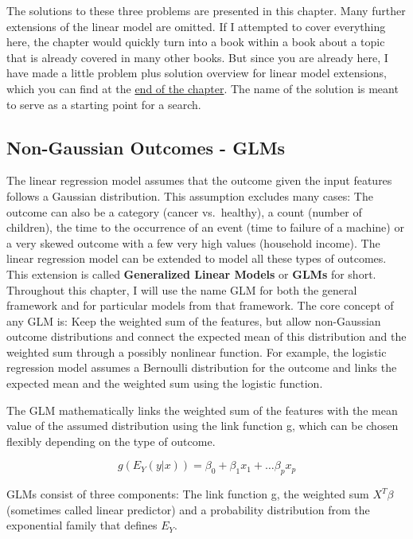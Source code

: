 \documentclass[
  12pt,
]{krantz}
\begin{document}
The solutions to these three problems are presented in this chapter.
Many further extensions of the linear model are omitted.
If I attempted to cover everything here, the chapter would quickly turn into a book within a book about a topic that is already covered in many other books.
But since you are already here, I have made a little problem plus solution overview for linear model extensions, which you can find at the \protect\hyperlink{more-lm-extension}{end of the chapter}.
The name of the solution is meant to serve as a starting point for a search.

\hypertarget{glm}{%
\subsection{Non-Gaussian Outcomes - GLMs}\label{glm}}

The linear regression model assumes that the outcome given the input features follows a Gaussian distribution.
This assumption excludes many cases:
The outcome can also be a category (cancer vs.~healthy), a count (number of children), the time to the occurrence of an event (time to failure of a machine) or a very skewed outcome with a few very high values (household income).
The linear regression model can be extended to model all these types of outcomes.
This extension is called \textbf{Generalized Linear Models} or \textbf{GLMs} for short.
Throughout this chapter, I will use the name GLM for both the general framework and for particular models from that framework.
The core concept of any GLM is:
Keep the weighted sum of the features, but allow non-Gaussian outcome distributions and connect the expected mean of this distribution and the weighted sum through a possibly nonlinear function.
For example, the logistic regression model assumes a Bernoulli distribution for the outcome and links the expected mean and the weighted sum using the logistic function.

The GLM mathematically links the weighted sum of the features with the mean value of the assumed distribution using the link function g, which can be chosen flexibly depending on the type of outcome.

\[g(E_Y(y|x))=\beta_0+\beta_1{}x_{1}+\ldots{}\beta_p{}x_{p}\]

GLMs consist of three components:
The link function g, the weighted sum \(X^T\beta\) (sometimes called linear predictor) and a probability distribution from the exponential family that defines \(E_Y\).
\end{document}
